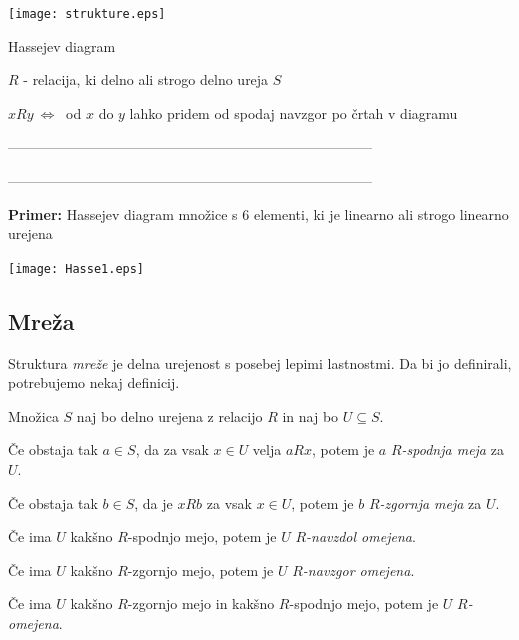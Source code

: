 \documentclass[11pt,paper=b5,footinclude,headinclude]{scrbook} %
\newcounter{example}
\def\cee {{~\Leftrightarrow~}}
\begin{document}
\begin{center}
\texttt{[image: strukture.eps]}
\end{center}

Hassejev diagram

$R$ - relacija, ki delno ali strogo delno ureja $S$

$xRy\cee $ od $x$ do $y$ lahko pridem od spodaj navzgor po črtah v diagramu

\bigskip
------------------------------------------------------------------------------

\bigskip

\bigskip

------------------------------------------------------------------------------
\bigskip

\textbf{ Primer:} Hassejev diagram množice s $6$ elementi,
ki je linearno ali strogo linearno urejena

\begin{center}
\texttt{[image: Hasse1.eps]}
\end{center}

\subsection{Mreža}

Struktura {\em mreže} je delna urejenost s posebej lepimi lastnostmi. Da bi jo definirali, potrebujemo nekaj definicij.

\bigskip

Množica $S$ naj bo delno urejena z relacijo $R$ in naj bo $U\subseteq S$.

Če obstaja tak $a\in S$, da za vsak $x\in U$ velja $aRx$, potem je
$a$ {\em $R$-spodnja meja} za $U$.

\bigskip
Če obstaja tak $b\in S$, da je $xRb$ za vsak $x\in U$, potem je
$b$ {\em $R$-zgornja meja} za $U$.

\bigskip
Če ima $U$ kakšno $R$-spodnjo mejo, potem je $U$ {\em $R$-navzdol omejena}.

\bigskip
Če ima $U$ kakšno $R$-zgornjo mejo, potem je $U$ {\em $R$-navzgor omejena}.

\bigskip
Če ima $U$ kakšno $R$-zgornjo mejo in kakšno $R$-spodnjo mejo,
potem je $U$  {\em $R$-omejena}.
\end{document}
